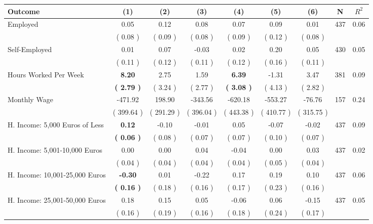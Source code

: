 \begin{tabular}{lcccccccc}
\toprule
 \textbf{Outcome} & \textbf{(1)} & \textbf{(2)} & \textbf{(3)} & \textbf{(4)} & \textbf{(5)} & \textbf{(6)} & \textbf{N} & \textbf{$ R^2$} \\
\midrule
Employed &      0.05 &      0.12 &      0.08 &      0.07 &      0.09 &      0.01 & 437 &       0.06 \\ 
 & (     0.08 ) & (     0.09 ) & (     0.08 ) & (     0.09 ) & (     0.12 ) & (     0.08 ) & \\
Self-Employed &      0.01 &      0.07 &     -0.03 &      0.02 &      0.20 &      0.05 & 430 &       0.05 \\ 
 & (     0.11 ) & (     0.12 ) & (     0.11 ) & (     0.12 ) & (     0.16 ) & (     0.11 ) & \\
Hours Worked Per Week & \textbf{     8.20} &      2.75 &      1.59 & \textbf{     6.39} &     -1.31 &      3.47 & 381 &       0.09 \\ 
 & \textbf{(     2.79 )} & (     3.24 ) & (     2.77 ) & \textbf{(     3.08 )} & (     4.13 ) & (     2.82 ) & \\
Monthly Wage &   -471.92 &    198.90 &   -343.56 &   -620.18 &   -553.27 &    -76.76 & 157 &       0.24 \\ 
 & (   399.64 ) & (   291.29 ) & (   396.04 ) & (   443.38 ) & (   410.77 ) & (   315.75 ) & \\
H. Income: 5,000 Euros of Less & \textbf{     0.12} &     -0.10 &     -0.01 &      0.05 &     -0.07 &     -0.02 & 437 &       0.09 \\ 
 & \textbf{(     0.06 )} & (     0.08 ) & (     0.07 ) & (     0.07 ) & (     0.10 ) & (     0.07 ) & \\
H. Income: 5,001-10,000 Euros &      0.00 &      0.00 &      0.04 &     -0.04 &      0.00 &      0.03 & 437 &       0.02 \\ 
 & (     0.04 ) & (     0.04 ) & (     0.04 ) & (     0.04 ) & (     0.05 ) & (     0.04 ) & \\
H. Income: 10,001-25,000 Euros & \textbf{    -0.30} &      0.01 &     -0.22 &      0.17 &      0.19 &      0.10 & 437 &       0.06 \\ 
 & \textbf{(     0.16 )} & (     0.18 ) & (     0.16 ) & (     0.17 ) & (     0.23 ) & (     0.16 ) & \\
H. Income: 25,001-50,000 Euros &      0.18 &      0.15 &      0.05 &     -0.06 &      0.06 &     -0.15 & 437 &       0.05 \\ 
 & (     0.16 ) & (     0.19 ) & (     0.16 ) & (     0.18 ) & (     0.24 ) & (     0.17 ) & \\

\end{tabular}
